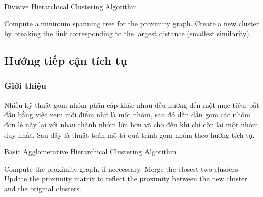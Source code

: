 \begin{algorithm}
\caption{Divisive Hierarchical Clustering Algorithm}\label{Divisive}
\begin{algorithmic}[1]
\State Compute a minimum spanning tree for the proximity graph.
\Repeat
\State Create a new cluster by breaking the link corresponding to the largest distance (smallest similarity).
\end{algorithmic}
\end{algorithm}

		
		
\subsection{Hướng tiếp cận tích tụ}
\subsubsection{Giới thiệu}
Nhiều kỹ thuật gom nhóm phân cấp khác nhau đều hướng đến một mục tiêu: bắt đầu bằng việc xem mỗi điểm như là một nhóm, sau đó dần dần gom các nhóm đơn lẻ này lại với nhau thành nhóm lớn hơn và cho đến khi chỉ còn lại một nhóm duy nhất.
Sau đây là thuật toán mô tả quá trình gom nhóm theo hướng tích tụ.

\begin{algorithm}
\caption{Basic Agglomerative Hierarchical Clustering Algorithm}\label{agglomerative}
\begin{algorithmic}[1]
\State Compute the proximity graph, if neccessary.
\Repeat
\State Merge the closest two clusters.
\State Update the proximity matrix to reflect the proximity between the new cluster and the original clusters.
\end{algorithmic}
\end{algorithm}

		
